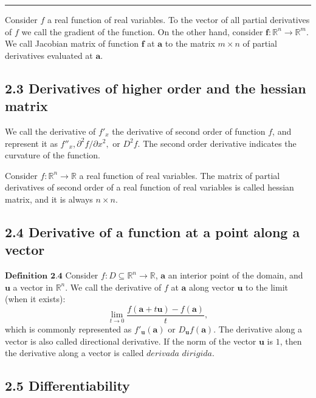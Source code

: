 \documentclass[0pt, a4paper]{article}
\begin{document}
\noindent\rule{\textwidth}{1pt}

Consider $f$ a real function of real variables. To the vector of all partial derivatives of $f$ we call the gradient of the function. On the other hand, consider $\textbf{f}:\mathbb{R}^n\to\mathbb{R}^m$. We call Jacobian matrix of function $\textbf{f}$ at $\textbf{a}$ to the matrix $m\times n$ of partial derivatives evaluated at $\textbf{a}$.

\subsection*{2.3 Derivatives of higher order and the hessian matrix}

We call the derivative of $f'_x$ the derivative of second order of function $f$, and represent it as $f''_x, \partial^2f/\partial x^2,\text{ or }D^2f$. The second order derivative indicates the curvature of the function.

Consider $f:\mathbb{R}^n\to\mathbb{R}$ a real function of real variables. The matrix of partial derivatives of second order  of a real function of real variables is called hessian matrix, and it is always $n\times n$.


\subsection*{2.4 Derivative of a function at a point along a vector}

$\textbf{Definition 2.4}$ Consider $f:D\subseteq\mathbb{R}^n\to\mathbb{R}$, $\textbf{a}$ an interior point of the domain, and $\textbf{u}$ a vector in $\mathbb{R}^n$. We call the derivative of $f$ at $\textbf{a}$ along vector $\textbf{u}$ to the limit (when it exists):
$$\lim_{t\to0}\frac{f(\textbf{a}+t\textbf{u})-f(\textbf{a})}{t},$$
which is commonly represented as $f'_\textbf{u}(\textbf{a})$ or $D_\textbf{u}f(\textbf{a})$. The derivative along a vector is also called directional derivative. If the norm of the vector $\textbf{u}$ is $1$, then the derivative along a vector is called $\textit{derivada dirigida}$.

\subsection*{2.5 Differentiability}
\end{document}
